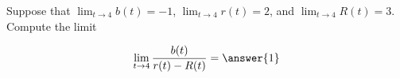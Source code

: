 \documentclass{ximera}
\author{Matthew Carr}
\begin{document}
\begin{exercise}
Suppose that $\lim_{t\to4}b(t)=-1$, $\lim_{t\to4}r(t)=2$, and $\lim_{t\to4}R(t)=3$. Compute the limit

\[
\lim_{t\to 4 } \frac{b(t)}{r(t)-R(t)} = \answer{1}
\]
\end{exercise}
\end{document}
